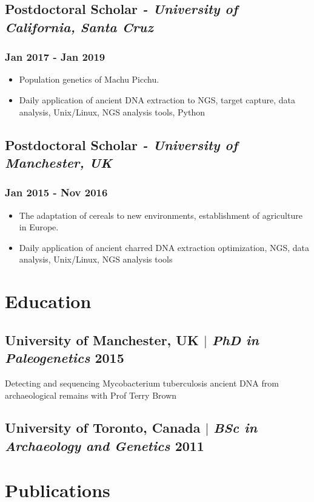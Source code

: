 \documentclass[11pt]{article}
\begin{document}
\subsection{Postdoctoral Scholar \normalfont\textit{- University of California, Santa Cruz}}
\subsubsection{Jan 2017 - Jan 2019}
\begin{itemize}
    \item Population genetics of Machu Picchu.
    \item Daily application of ancient DNA extraction to NGS, target capture, data analysis, Unix/Linux, NGS analysis tools, Python
\end{itemize}
\bigskip

\subsection{Postdoctoral Scholar \normalfont\textit{- University of Manchester, UK}}
\subsubsection{Jan 2015 - Nov 2016}
\begin{itemize}
    \item The adaptation of cereals to new environments, establishment of agriculture in Europe.
    \item Daily application of ancient charred DNA extraction optimization, NGS, data analysis, Unix/Linux, NGS analysis tools
\end{itemize}


\section{Education}
\bigskip
\subsection{University of Manchester, UK $|$ {\normalfont\textit{PhD in Paleogenetics} \hfill 2015}}
\begin{description}[leftmargin=5pt]
    \item Detecting and sequencing Mycobacterium tuberculosis ancient DNA from archaeological remains with Prof Terry
Brown
\end{description}

\subsection{University of Toronto, Canada $|$ {\normalfont\textit{BSc in Archaeology and Genetics} \hfill 2011}}
\bigskip
\bigskip



\section{Publications}

\nocite{*}
\setlength{\bibhang}{0pt}
\printbibliography[heading=none]
\vspace{-5pt}



\end{document}
